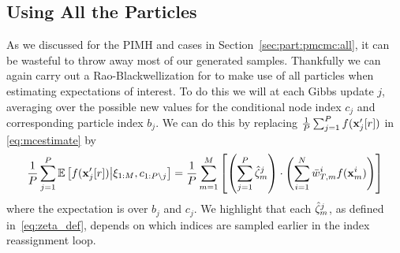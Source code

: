 \subsection{Using All the Particles}
\label{sec:part:ipmcmc:allparticles}
\vspace{-4pt}
As we discussed for the PIMH and \pg cases in Section~\ref{sec:part:pmcmc:all},
it can be wasteful to throw away most of our generated samples.  Thankfully we
can again carry out a Rao-Blackwellization for \ipmcmc to 
make use of all particles when estimating expectations of interest.  To do this
we will at each Gibbs update $j$, averaging over the possible new values for the 
conditional node index $c_j$ and corresponding particle index $b_j$. We can do this by replacing $\frac{1}{P}\sum_{j=1}^P f(\mathbf{x}_j'[r])$ 
in \eqref{eq:mcestimate} by
\begin{align*}
\frac{1}{P}\sum_{j=1}^P \mathbb{E}\left[f(\mathbf{x}_j'[r]) \middle| \xi_{1:M}, c_{1:P\backslash j} \right] 
=\frac{1}{P} \sum_{m=1}^M  \left[\left(\sum_{j=1}^P \hat \zeta_m^j \right) \cdot 
\left(\sum_{i=1}^N \bar w_{T,m}^i  f(\mathbf{x}_{m}^{i}) \right)\right]
\end{align*}
where the expectation is over $b_j$ and $c_j$.
We highlight that each $\hat{\zeta}_{m}^j$, as defined in~\eqref{eq:zeta_def}, 
depends on which indices are sampled earlier in the index reassignment loop.  


